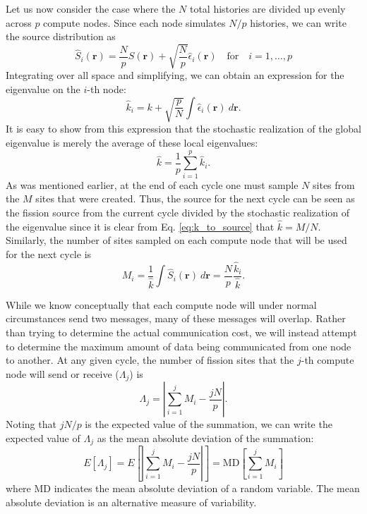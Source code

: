 Let us now consider the case where the $N$ total histories are divided
up evenly across $p$ compute nodes. Since each node simulates $N/p$
histories, we can write the source distribution as
\begin{equation}
  \hat{S}_i(\mathbf{r})= \frac{N}{p} S(\mathbf{r}) +
  \sqrt{\frac{N}{p}} \hat{\epsilon}_i(\mathbf{r}) \quad \text{for}
  \quad i = 1, \dots, p
\end{equation}
Integrating over all space and simplifying, we can obtain an
expression for the eigenvalue on the $i$-th node:
\begin{equation}
  \hat{k}_i = k + \sqrt{\frac{p}{N}} \int \hat{\epsilon}_i(\mathbf{r})
  \: d\mathbf{r}.
\end{equation}
It is easy to show from this expression that the stochastic
realization of the global eigenvalue is merely the average of these
local eigenvalues:
\begin{equation}\label{eq:average_k_as_sum}
  \hat{k} = \frac{1}{p} \sum_{i=1}^p \hat{k}_i.
\end{equation}
As was mentioned earlier, at the end of each cycle one must sample $N$
sites from the $M$ sites that were created. Thus, the source for the
next cycle can be seen as the fission source from the current cycle
divided by the stochastic realization of the eigenvalue since it is
clear from Eq. \ref{eq:k_to_source} that $\hat{k} = M/N$. Similarly,
the number of sites sampled on each compute node that will be used for
the next cycle is
\begin{equation}\label{eq:sites_per_node}
  M_i = \frac{1}{\hat{k}} \int \hat{S}_i(\mathbf{r}) \: d\mathbf{r} =
  \frac{N}{p} \frac{\hat{k}_i}{\hat{k}}.
\end{equation}

While we know conceptually that each compute node will under normal
circumstances send two messages, many of these messages will
overlap. Rather than trying to determine the actual communication
cost, we will instead attempt to determine the maximum amount of data
being communicated from one node to another. At any given cycle, the
number of fission sites that the $j$-th compute node will send or
receive ($\Lambda_j$) is
\begin{equation}\label{eq:Lambda}
  \Lambda_j = \left | \sum_{i=1}^j M_i - \frac{jN}{p} \right |.
\end{equation}
Noting that $jN/p$ is the expected value of the summation, we can
write the expected value of $\Lambda_j$ as the mean absolute deviation
of the summation:
\begin{equation}
  E \left [ \Lambda_j \right ] = E \left [ \left | \sum_{i=1}^j M_i -
    \frac{jN}{p} \right | \right ] = \text{MD} \left [ \sum_{i=1}^j
    M_i \right ]
\end{equation}
where $\text{MD}$ indicates the mean absolute deviation of a random
variable. The mean absolute deviation is an alternative measure of
variability.

